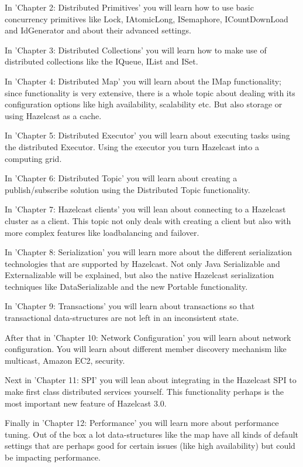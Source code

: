 In 'Chapter 2: Distributed Primitives' you will learn how to use basic concurrency primitives like Lock, IAtomicLong, ISemaphore, ICountDownLoad and IdGenerator and about their advanced settings.

In 'Chapter 3: Distributed Collections' you will learn how to make use of distributed collections like the IQueue, IList and ISet.

In 'Chapter 4: Distributed Map' you will learn about the IMap functionality; since functionality is very extensive, there is a whole topic about dealing with its configuration options like high availability, scalability etc. But also storage or using Hazelcast as a cache.

In 'Chapter 5: Distributed Executor' you will learn about executing tasks using the distributed Executor. Using the executor you turn Hazelcast into a computing grid. 

In 'Chapter 6: Distributed Topic' you will learn about creating a publish/subscribe solution using the Distributed Topic functionality.

In 'Chapter 7: Hazelcast clients' you will lean about connecting to a Hazelcast cluster as a client. This topic not only deals with creating a client but also with more complex features like loadbalancing and failover.

In 'Chapter 8: Serialization' you will learn more about the different serialization technologies that are supported by Hazelcast. Not only Java Serializable and Externalizable will be explained, but also the native Hazelcast serialization techniques like DataSerializable and the new Portable functionality.

In 'Chapter 9: Transactions' you will learn about transactions so that transactional data-structures are not left in an inconsistent state.

After that in 'Chapter 10: Network Configuration' you will learn about network configuration. You will learn about different member discovery mechanism like multicast, Amazon EC2, security. 

Next in 'Chapter 11: SPI' you will lean about integrating in the Hazelcast SPI to make first class distributed services yourself. This functionality perhaps is the most important new feature of Hazelcast 3.0.

Finally in 'Chapter 12: Performance'  you will learn more about performance tuning.  Out of the box a lot data-structures like the map have all kinds of default settings that are perhaps good for certain issues (like high availability) but could be impacting performance. 

